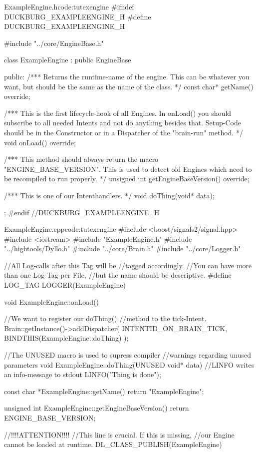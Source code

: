 \documentclass[12pt,a4paper]{article}
\begin{document}
\begin{duckc++}{ExampleEngine.h}{code:tutexengine}    
#ifndef DUCKBURG_EXAMPLEENGINE_H
#define DUCKBURG_EXAMPLEENGINE_H

#include "../core/EngineBase.h"

class ExampleEngine : public EngineBase {
public:
    /***
    Returns the runtime-name of the engine. 
    This can be whatever you want,
    but should be the same as the name of the class.
    */
    const char* getName() override;

    /***
    This is the first lifecycle-hook of all Engines. 
    In onLoad() you should subscribe to all needed 
    Intents and not do anything besides that.
    Setup-Code should be in the Constructor or in a 
    Dispatcher of the "brain-run" method.
    */
    void onLoad() override;

    /***
    This method should always return 
    the macro "ENGINE_BASE_VERSION".
    This is used to detect old Engines which need
    to be recompiled to run properly.
    */
    unsigned int getEngineBaseVersion() override;


    /***
    This is one of our Intenthandlers.
    */
    void doThing(void* data);
};
#endif //DUCKBURG_EXAMPLEENGINE_H
\end{duckc++}    
\begin{duckc++}{ExampleEngine.cpp}{code:tutexengine}
#include <boost/signals2/signal.hpp>
#include <iostream>
#include "ExampleEngine.h"
#include "../hightools/Dyllo.h"
#include "../core/Brain.h"
#include "../core/Logger.h"

//All Log-calls after this Tag will be 
//tagged accordingly.
//You can have more than one Log-Tag per File,
//but the name should be descriptive.
#define LOG_TAG LOGGER(ExampleEngine)

void ExampleEngine::onLoad() {

    //We want to register our doThing()
    //method to the tick-Intent.
    Brain::getInstance()->addDispatcher(
        INTENTID_ON_BRAIN_TICK, 
        BINDTHIS(ExampleEngine::doThing)
    );
}

//The UNUSED macro is used to supress compiler
//warnings regarding unused parameters
void ExampleEngine::doThing(UNUSED void* data) {
    //LINFO writes an info-message to stdout
    LINFO("Thing is done");
}

const char *ExampleEngine::getName() {
    return "ExampleEngine";
}

unsigned int ExampleEngine::getEngineBaseVersion() {
    return ENGINE_BASE_VERSION;
}

//!!!!ATTENTION!!!!
//This line is crucial. If this is missing,
//our Engine cannot be loaded at runtime.
DL_CLASS_PUBLISH(ExampleEngine)
\end{duckc++}
\end{document}
